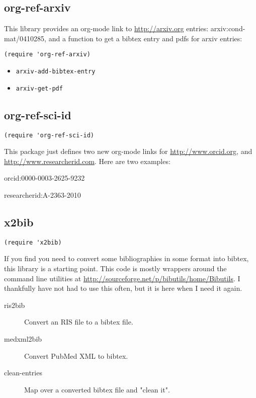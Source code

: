 \documentclass[11pt]{article}
\begin{document}
\subsection{org-ref-arxiv}
\label{sec:orgcb65ff1}

This library provides an org-mode link to \url{http://arxiv.org} entries:  arxiv:cond-mat/0410285, and a function to get a bibtex entry and pdfs for arxiv entries:

\begin{verbatim}
(require 'org-ref-arxiv)
\end{verbatim}

\begin{itemize}
\item \texttt{arxiv-add-bibtex-entry}
\item \texttt{arxiv-get-pdf}
\end{itemize}

\subsection{org-ref-sci-id}
\label{sec:org77031dd}
 

\begin{verbatim}
(require 'org-ref-sci-id)
\end{verbatim}

This package just defines two new org-mode links for \url{http://www.orcid.org}, and \url{http://www.researcherid.com}. Here are two examples:

orcid:0000-0003-2625-9232

researcherid:A-2363-2010

\subsection{x2bib}
\label{sec:orgb027a03}

\begin{verbatim}
(require 'x2bib)
\end{verbatim}

If you find you need to convert some bibliographies in some format into bibtex, this library is a starting point. This code is mostly wrappers around the command line utilities at \url{http://sourceforge.net/p/bibutils/home/Bibutils}. I thankfully have not had to use this often, but it is here when I need it again.

\begin{description}
\item[{ris2bib}] Convert an RIS file to a bibtex file.
\item[{medxml2bib}] Convert PubMed XML to bibtex.
\item[{clean-entries}] Map over a converted bibtex file and "clean it".
\end{description}
\end{document}
